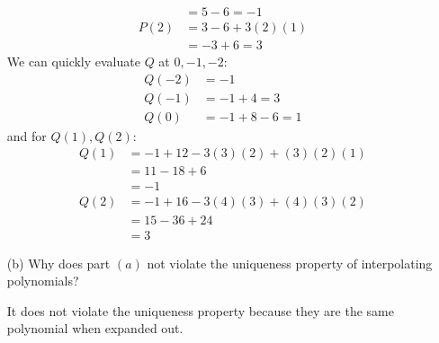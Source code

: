 \documentclass{article}
\begin{document}
\begin{itemize}
\begin{answer}
\begin{align*}
                              &= 5 - 6 = -1           \\
                        P(2)  &= 3 - 6 + 3(2)(1)      \\
                              &= -3 + 6 = 3             
                    \end{align*}
                We can quickly evaluate $Q$ at $0, -1, -2$:
                    \begin{align*}
                        Q(-2) &= -1             \\
                        Q(-1) &= -1 + 4 = 3     \\
                        Q(0)  &= -1 + 8 - 6 = 1   
                    \end{align*}
                and for $Q(1), Q(2)$:
                    \begin{align*}
                        Q(1) &= -1 + 12 - 3(3)(2) + (3)(2)(1) \\
                             &= 11 - 18 + 6                   \\
                             &= -1                            \\
                        Q(2) &= -1 + 16 - 3(4)(3) + (4)(3)(2) \\
                             &= 15 - 36 + 24                  \\
                             &= 3                               
                    \end{align*}
            \end{answer}

        \item [(b)] Why does part $(a)$ not violate the uniqueness property of interpolating polynomials? 
            \begin{answer}
                It does not violate the uniqueness property because they are the same polynomial when expanded out.
            \end{answer}
    \end{itemize}
\end{document}
